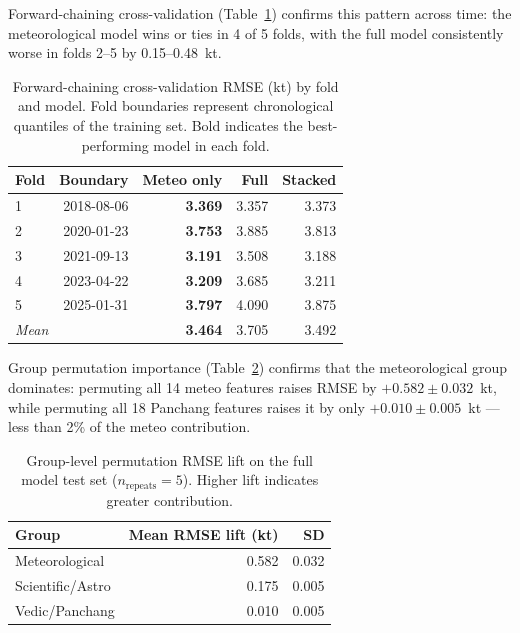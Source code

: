 \documentclass[12pt,a4paper]{article}
\begin{document}
Forward-chaining cross-validation (Table~\ref{tab:cv}) confirms this pattern
across time: the meteorological model wins or ties in 4 of 5 folds, with the
full model consistently worse in folds 2--5 by 0.15--0.48~kt.

\begin{table}[H]
  \centering
  \caption{Forward-chaining cross-validation RMSE (kt) by fold and model.
           Fold boundaries represent chronological quantiles of the training set.
           Bold indicates the best-performing model in each fold.}
  \label{tab:cv}
  \begin{tabular}{lrrrr}
    \toprule
    \textbf{Fold} & \textbf{Boundary} & \textbf{Meteo only} & \textbf{Full} & \textbf{Stacked} \\
    \midrule
    1 & 2018-08-06 & \textbf{3.369} & 3.357 & 3.373 \\
    2 & 2020-01-23 & \textbf{3.753} & 3.885 & 3.813 \\
    3 & 2021-09-13 & \textbf{3.191} & 3.508 & 3.188 \\
    4 & 2023-04-22 & \textbf{3.209} & 3.685 & 3.211 \\
    5 & 2025-01-31 & \textbf{3.797} & 4.090 & 3.875 \\
    \bottomrule
    \multicolumn{2}{l}{\textit{Mean}} & \textbf{3.464} & 3.705 & 3.492 \\
    \bottomrule
  \end{tabular}
\end{table}

Group permutation importance (Table~\ref{tab:group_imp}) confirms that the
meteorological group dominates: permuting all 14 meteo features raises RMSE by
$+0.582\pm0.032$~kt, while permuting all 18 Panchang features raises it by only
$+0.010\pm0.005$~kt — less than 2\% of the meteo contribution.

\begin{table}[H]
  \centering
  \caption{Group-level permutation RMSE lift on the full model test set
           ($n_\text{repeats} = 5$). Higher lift indicates greater contribution.}
  \label{tab:group_imp}
  \begin{tabular}{lrr}
    \toprule
    \textbf{Group} & \textbf{Mean RMSE lift (kt)} & \textbf{SD} \\
    \midrule
    Meteorological      & 0.582 & 0.032 \\
    Scientific/Astro    & 0.175 & 0.005 \\
    Vedic/Panchang      & 0.010 & 0.005 \\
    \bottomrule
  \end{tabular}
\end{table}
\end{document}
